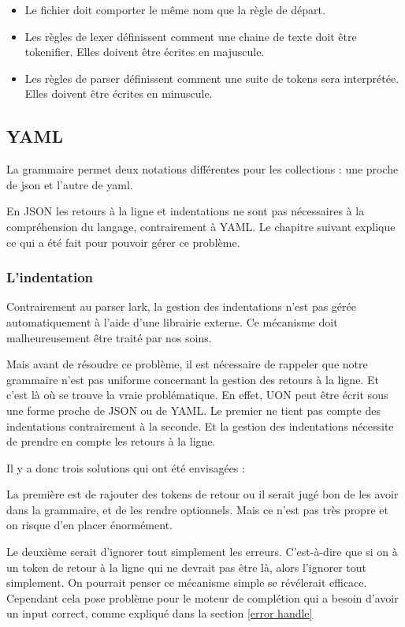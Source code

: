 \documentclass[
    iict, %
    il, %
]{heig-tb}
\begin{document}
\begin{itemize}
    \item Le fichier doit comporter le même nom que la règle de départ.
    \item Les règles de lexer définissent comment une chaine de texte doit être tokenifier. Elles doivent être écrites en majuscule.
    \item Les règles de parser définissent comment une suite de tokens sera interprétée. Elles doivent être écrites en minuscule.
\end{itemize}

\subsection{YAML}

La grammaire permet deux notations différentes pour les collections : une proche de json et l'autre de yaml.

En JSON les retours à la ligne et indentations ne sont pas nécessaires à la compréhension du langage, contrairement à YAML.
Le chapitre suivant explique ce qui a été fait pour pouvoir gérer ce problème.

\subsubsection{L'indentation}

Contrairement au parser lark, la gestion des indentations n'est pas gérée automatiquement à l'aide d'une librairie externe.
Ce mécanisme doit malheureusement être traité par nos soins.

Mais avant de résoudre ce problème, il est nécessaire de rappeler que notre grammaire n'est pas uniforme concernant la gestion des retours à la ligne.
Et c'est là où se trouve la vraie problématique. En effet, UON peut être écrit sous une forme proche de JSON ou de YAML. Le premier ne tient pas compte des indentations contrairement à la seconde.
Et la gestion des indentations nécessite de prendre en compte les retours à la ligne.

Il y a donc trois solutions qui ont été envisagées :

La première est de rajouter des tokens de retour ou il serait jugé bon de les avoir dans la grammaire, et de les rendre optionnels.
Mais ce n'est pas très propre et on risque d'en placer énormément.

Le deuxième serait d'ignorer tout simplement les erreurs.  C'est-à-dire que si on à un token de retour à la ligne qui ne devrait pas être là, alors l'ignorer tout simplement.
On pourrait penser ce mécanisme simple se révélerait efficace. Cependant cela pose problème pour le moteur de complétion qui a besoin d'avoir un input correct, comme expliqué dans la section \ref{error handle}
\end{document}
